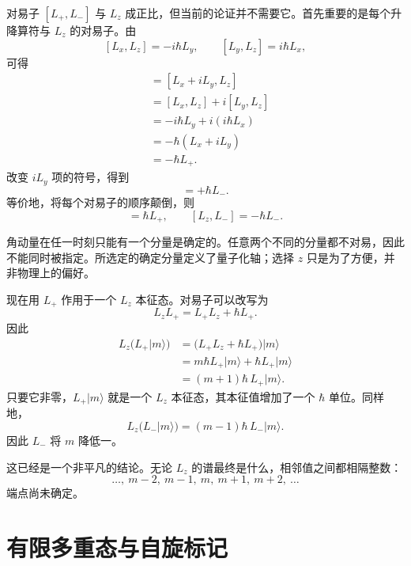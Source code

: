 对易子 \([L_+,L_-]\) 与 \(L_z\) 成正比，但当前的论证并不需要它。首先重要的是每个升降算符与 \(L_z\) 的对易子。由
\[
[L_x,L_z]=-i\hbar L_y,
\qquad
[L_y,L_z]=i\hbar L_x,
\]
可得
\begin{align}
[L_+,L_z]
&=[L_x+iL_y,L_z] \\
&=[L_x,L_z]+i[L_y,L_z] \\
&=-i\hbar L_y+i(i\hbar L_x) \\
&=-\hbar(L_x+iL_y) \\
&=-\hbar L_+.
\end{align}
改变 \(iL_y\) 项的符号，得到
\begin{equation}
[L_-,L_z]=+\hbar L_-.
\end{equation}
等价地，将每个对易子的顺序颠倒，则
\begin{equation}
[L_z,L_+]=\hbar L_+,
\qquad
[L_z,L_-]=-\hbar L_-.
\end{equation}

角动量在任一时刻只能有一个分量是确定的。任意两个不同的分量都不对易，因此不能同时被指定。所选定的确定分量定义了量子化轴；选择 \(z\) 只是为了方便，并非物理上的偏好。

现在用 \(L_+\) 作用于一个 \(L_z\) 本征态。对易子可以改写为
\begin{equation}
L_zL_+=L_+L_z+\hbar L_+.
\end{equation}
因此
\begin{align}
L_z\bigl(L_+\lvert m\rangle\bigr)
&=\bigl(L_+L_z+\hbar L_+\bigr)\lvert m\rangle \\
&=m\hbar L_+\lvert m\rangle+\hbar L_+\lvert m\rangle \\
&=(m+1)\hbar\,L_+\lvert m\rangle.
\end{align}
只要它非零，\(L_+\lvert m\rangle\) 就是一个 \(L_z\) 本征态，其本征值增加了一个 \(\hbar\) 单位。同样地，
\begin{equation}
L_z\bigl(L_-\lvert m\rangle\bigr)
=(m-1)\hbar\,L_-\lvert m\rangle.
\end{equation}
因此 \(L_-\) 将 \(m\) 降低一。

这已经是一个非平凡的结论。无论 \(L_z\) 的谱最终是什么，相邻值之间都相隔整数：
\begin{equation}
\ldots,\ m-2,\ m-1,\ m,\ m+1,\ m+2,\ \ldots
\end{equation}
端点尚未确定。

\section{有限多重态与自旋标记}

